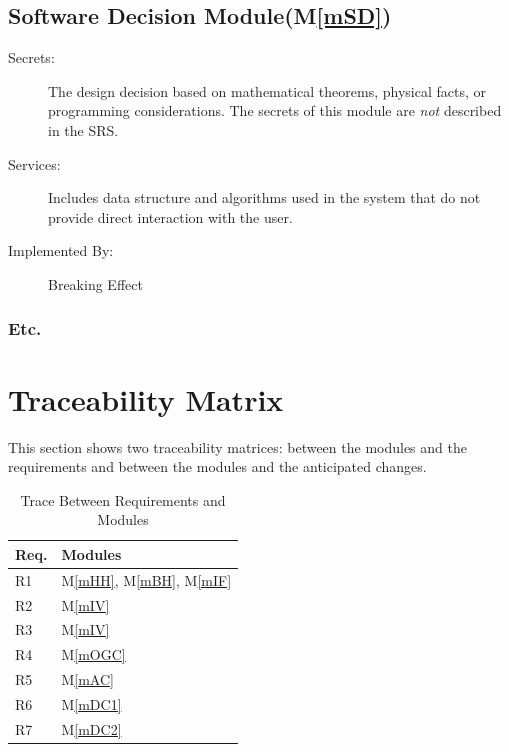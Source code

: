 \documentclass[12pt, titlepage]{article}
\newcommand{\mref}[1]{M\ref{#1}}
\begin{document}
	\subsection{Software Decision Module(\mref{mSD})}
	
	\begin{description}
		\item[Secrets:] The design decision based on mathematical theorems, physical
		facts, or programming considerations. The secrets of this module are
		\emph{not} described in the SRS.
		\item[Services:] Includes data structure and algorithms used in the system that
		do not provide direct interaction with the user. 
		\item[Implemented By:] Breaking Effect
	\end{description}
	
	\subsubsection{Etc.}
	
	\section{Traceability Matrix} \label{SecTM}
	
	This section shows two traceability matrices: between the modules and the
	requirements and between the modules and the anticipated changes.
	
	\begin{table}[H]
		\centering
		\begin{tabular}{p{} p{}}
			\toprule
			\textbf{Req.} & \textbf{Modules}\\
			\midrule
			R1 & \mref{mHH}, \mref{mBH}, \mref{mIF}\\
			R2 & \mref{mIV}\\
			R3 & \mref{mIV}\\
			R4 & \mref{mOGC}\\
			R5 & \mref{mAC}\\
			R6 & \mref{mDC1}\\
			R7 & \mref{mDC2}\\
			\bottomrule
		\end{tabular}
		\caption{Trace Between Requirements and Modules}
		\label{TblRT}
	\end{table}
	
\end{document}
